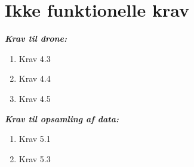 \section{Ikke funktionelle krav}

\textbf{\textit{Krav til drone:} }
\begin{enumerate}
\item Krav 4.3
\item Krav 4.4
\item Krav 4.5\\
\end{enumerate}

\textbf{\textit{Krav til opsamling af data:} }
\begin{enumerate}
\item Krav 5.1
\item Krav 5.3\\
\end{enumerate}